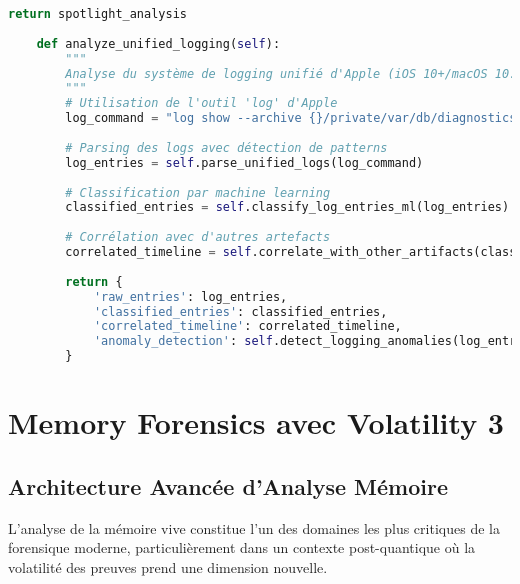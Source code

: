\begin{lstlisting}[language=Python, caption=Analyseur SQLite macOS avec préservation d'intégrité]
        return spotlight_analysis
    
    def analyze_unified_logging(self):
        """
        Analyse du système de logging unifié d'Apple (iOS 10+/macOS 10.12+)
        """
        # Utilisation de l'outil 'log' d'Apple
        log_command = "log show --archive {}/private/var/db/diagnostics".format(self.image)
        
        # Parsing des logs avec détection de patterns
        log_entries = self.parse_unified_logs(log_command)
        
        # Classification par machine learning
        classified_entries = self.classify_log_entries_ml(log_entries)
        
        # Corrélation avec d'autres artefacts
        correlated_timeline = self.correlate_with_other_artifacts(classified_entries)
        
        return {
            'raw_entries': log_entries,
            'classified_entries': classified_entries,
            'correlated_timeline': correlated_timeline,
            'anomaly_detection': self.detect_logging_anomalies(log_entries)
        }
\end{lstlisting}

\section{Memory Forensics avec Volatility 3}

\subsection{Architecture Avancée d'Analyse Mémoire}

L'analyse de la mémoire vive constitue l'un des domaines les plus critiques de la forensique moderne, particulièrement dans un contexte post-quantique où la volatilité des preuves prend une dimension nouvelle.

